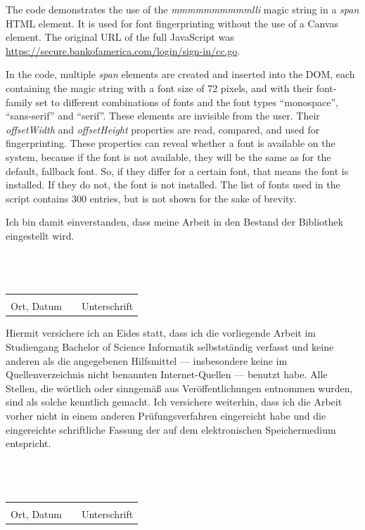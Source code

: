 \documentclass[
    fontsize=12pt,
    headings=small,
    parskip=half,
    bibliography=totoc,
    numbers=noenddot,
    open=any
    ]{scrreprt}
\begin{document}
\begin{appendices}
The code demonstrates the use of the \textit{mmmmmmmmmmlli} magic string in a \textit{span} HTML element.
It is used for font fingerprinting without the use of a Canvas element.
The original URL of the full JavaScript was \url{https://secure.bankofamerica.com/login/sign-in/cc.go}.

In the code, multiple \textit{span} elements are created and inserted into the DOM,
each containing the magic string with a font size of 72 pixels, and with their font-family
set to different combinations of fonts and the font types ``monospace'', ``sans-serif'' and ``serif''.
These elements are invisible from the user.
Their \textit{offsetWidth} and \textit{offsetHeight} properties are read, compared, and
used for fingerprinting.
These properties can reveal whether a font is available on the system, because
if the font is not available, they will be the same as for the default, fallback
font. So, if they differ for a certain font, that means the font is installed. If they do not,
the font is not installed.
The list of fonts used in the script contains 300 entries, but is not shown for the sake of brevity.


\end{appendices}

\clearpage

\printbibliography

\newpage
Ich bin damit einverstanden, dass meine Arbeit in den Bestand der Bibliothek eingestellt wird.
\\
\\
\\
\\
\begin{tabular}{lp{5em}l}
 \hspace{5cm}   && \hspace{3cm} \\\cline{1-1}\cline{3-3}
 Ort, Datum     && Unterschrift
\end{tabular}

\newpage
Hiermit versichere ich an Eides statt, dass ich die vorliegende Arbeit im Studiengang Bachelor of Science Informatik selbstständig verfasst und keine anderen als die angegebenen Hilfsmittel --- insbesondere keine im Quellenverzeichnis nicht benannten Internet-Quellen --- benutzt habe. Alle Stellen, die wörtlich oder sinngemäß aus Veröffentlichungen entnommen wurden, sind als solche kenntlich gemacht. Ich versichere weiterhin, dass ich die Arbeit vorher nicht in einem anderen Prüfungsverfahren eingereicht habe und die eingereichte schriftliche Fassung der auf dem elektronischen Speichermedium entspricht.
\\
\\
\\
\\

\begin{tabular}{lp{5em}l}
 \hspace{5cm}   && \hspace{3cm} \\\cline{1-1}\cline{3-3}
 Ort, Datum     && Unterschrift
\end{tabular}
\end{document}
